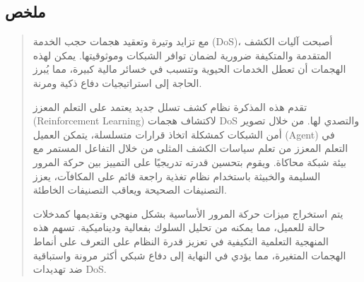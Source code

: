 \documentclass[16pt]{report}
\begin{document}
\newpage
\begin{otherlanguage}{arabic}
\chapter*{ملخص}

\begin{quote}
\large
مع تزايد وتيرة وتعقيد هجمات حجب الخدمة (DoS)، أصبحت آليات الكشف المتقدمة والمتكيفة ضرورية لضمان توافر الشبكات وموثوقيتها. يمكن لهذه الهجمات أن تعطل الخدمات الحيوية وتتسبب في خسائر مالية كبيرة، مما يُبرز الحاجة إلى استراتيجيات دفاع ذكية ومرنة.

تقدم هذه المذكرة نظام كشف تسلل جديد يعتمد على التعلم المعزز (Reinforcement Learning) لاكتشاف هجمات DoS والتصدي لها. من خلال تصوير أمن الشبكات كمشكلة اتخاذ قرارات متسلسلة، يتمكن العميل (Agent) في التعلم المعزز من تعلم سياسات الكشف المثلى من خلال التفاعل المستمر مع بيئة شبكة محاكاة. ويقوم بتحسين قدرته تدريجيًا على التمييز بين حركة المرور السليمة والخبيثة باستخدام نظام تغذية راجعة قائم على المكافآت، يعزز التصنيفات الصحيحة ويعاقب التصنيفات الخاطئة.

يتم استخراج ميزات حركة المرور الأساسية بشكل منهجي وتقديمها كمدخلات حالة للعميل، مما يمكنه من تحليل السلوك بفعالية وديناميكية. تسهم هذه المنهجية التعلمية التكيفية في تعزيز قدرة النظام على التعرف على أنماط الهجمات المتغيرة، مما يؤدي في النهاية إلى دفاع شبكي أكثر مرونة واستباقية ضد تهديدات DoS.
\end{quote}

\vspace{1em}
\end{otherlanguage}
\end{document}
